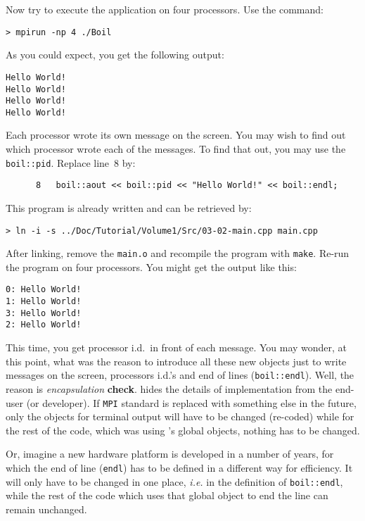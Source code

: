 Now try to execute the application on four processors. Use the command:
%
\begin{verbatim}
> mpirun -np 4 ./Boil
\end{verbatim}
%
As you could expect, you get the following output:
%
{\small \begin{verbatim}
Hello World!
Hello World!
Hello World!
Hello World!
\end{verbatim}}
%
Each processor wrote its own message on the screen. You may wish to find out 
which processor wrote each of the messages. To find that out, you may use
the {\tt boil::pid}. Replace line~8 by:
%
{\small \begin{verbatim}
      8   boil::aout << boil::pid << "Hello World!" << boil::endl;
\end{verbatim}}
%
This program is already written and can be retrieved by:
%
\begin{verbatim}
> ln -i -s ../Doc/Tutorial/Volume1/Src/03-02-main.cpp main.cpp
\end{verbatim}
%
After linking, remove the {\tt main.o} and recompile the program with {\tt make}.
Re-run the program on four processors. You might get the output like this:
%
{\small \begin{verbatim}
0: Hello World!
1: Hello World!
3: Hello World!
2: Hello World!
\end{verbatim}}
%
This time, you get processor i.d.\ in front of each message. You may wonder,
at this point, what was the reason to introduce all these new objects just to
write messages on the screen, processors i.d.'s and end of lines 
({\tt boil::endl}). Well, the reason is {\em encapsulation} {\bf check}. 
{\psiboil} hides the details of implementation from the end-user (or developer). 
If {\tt MPI} standard is replaced with something else in the future, only the
{\psiboil} objects for terminal output will have to be changed (re-coded)
while for the rest of the code, which was using {\psiboil}'s global 
objects, nothing has to be changed.

Or, imagine a new hardware platform is developed in a number of years, for 
which the end of line ({\tt endl}) has to be defined in a different way for
efficiency. It will only have to be changed in one place, {\em i.e.} in the
definition of {\tt boil::endl}, while the rest of the code which uses that
global object to end the line can remain unchanged.

